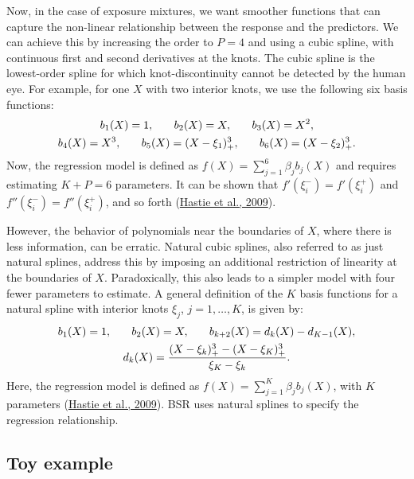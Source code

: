 \documentclass[12pt, twoside]{amherstthesis}
\begin{document}
Now, in the case of exposure mixtures, we want smoother functions that can capture the non-linear relationship between the response and the predictors. We can achieve this by increasing the order to \(P=4\) and using a cubic spline, with continuous first and second derivatives at the knots. The cubic spline is the lowest-order spline for which knot-discontinuity cannot be detected by the human eye. For example, for one \(X\) with two interior knots, we use the following six basis functions:
\begin{gather*}
b_1(X)=1, \hspace{0.25in}b_2(X)=X, \hspace{0.25in}b_3(X)=X^2, \\
b_4(X)=X^3, \hspace{0.25in} b_5(X)=(X-\xi_1)^3_+, \hspace{0.25in} b_6(X)=(X-\xi_2)^3_+.
\end{gather*}
\noindent Now, the regression model is defined as \(f(X)= \sum_{j=1}^6\beta_jb_j(X)\) and requires estimating \(K+P=6\) parameters. It can be shown that \(f'(\xi_i^-)= f'(\xi_i^+)\) and \(f''(\xi_i^-)= f''(\xi_i^+)\), and so forth (\protect\hyperlink{ref-hastie_elements_2009}{Hastie et al., 2009}).

However, the behavior of polynomials near the boundaries of \(X\), where there is less information, can be erratic. Natural cubic splines, also referred to as just natural splines, address this by imposing an additional restriction of linearity at the boundaries of \(X\). Paradoxically, this also leads to a simpler model with four fewer parameters to estimate. A general definition of the \(K\) basis functions for a natural spline with interior knots \(\xi_j\), \(j=1,\dots,K\), is given by:
\begin{gather*}
b_1(X)=1, \hspace{0.25in} b_2(X)=X, \hspace{0.25in} b_{k+2}(X)=d_k(X)-d_{K-1}(X), \\
d_k(X)=\frac{(X-\xi_k)^3_+ - (X-\xi_K)^3_+}{\xi_K-\xi_k}.
\end{gather*}
\noindent Here, the regression model is defined as \(f(X) = \sum_{j=1}^K\beta_jb_j(X)\), with \(K\) parameters (\protect\hyperlink{ref-hastie_elements_2009}{Hastie et al., 2009}). BSR uses natural splines to specify the regression relationship.

\hypertarget{toy-example}{%
\subsection{Toy example}\label{toy-example}}
\end{document}
